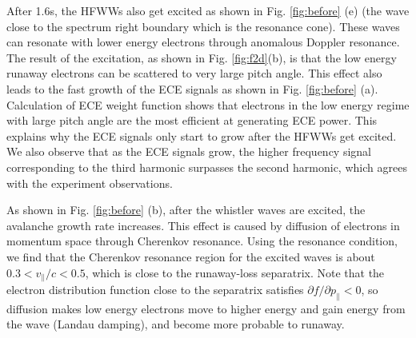 \documentclass[aps, prl, preprint,english,superscriptaddress]{revtex4-1}
\begin{document}
After 1.6s, the HFWWs also get excited as shown in Fig. \ref{fig:before} (e) (the wave close to the spectrum right boundary which is the resonance cone). These waves can resonate with lower energy electrons through anomalous Doppler resonance. The result of the excitation, as shown in Fig. \ref{fig:f2d}(b), is that the low energy runaway electrons can be scattered to very large pitch angle. This effect also leads to the fast growth of the ECE signals as shown in Fig. \ref{fig:before} (a). Calculation of ECE weight function\cite{liu_runaway_2017} shows that electrons in the low energy regime with large pitch angle are the most efficient at generating ECE power. This explains why the ECE signals only start to grow after the HFWWs get excited. We also observe that as the ECE signals grow, the higher frequency signal corresponding to the third harmonic surpasses the second harmonic, which agrees with the experiment observations\cite{paz-soldan_non-thermal_2016}.

As shown in Fig. \ref{fig:before} (b), after the whistler waves are excited, the avalanche growth rate increases. This effect is caused by diffusion of electrons in momentum space through Cherenkov resonance. Using the resonance condition, we find that the Cherenkov resonance region for the excited waves is about $0.3<v_{\parallel}/c<0.5$, which is close to the runaway-loss separatrix\cite{liu_adjoint_2016}. Note that the electron distribution function close to the separatrix satisfies $\partial f/\partial p_{\parallel}<0$, so diffusion makes low energy electrons move to higher energy and gain energy from the wave (Landau damping), and become more probable to runaway.

\end{document}
